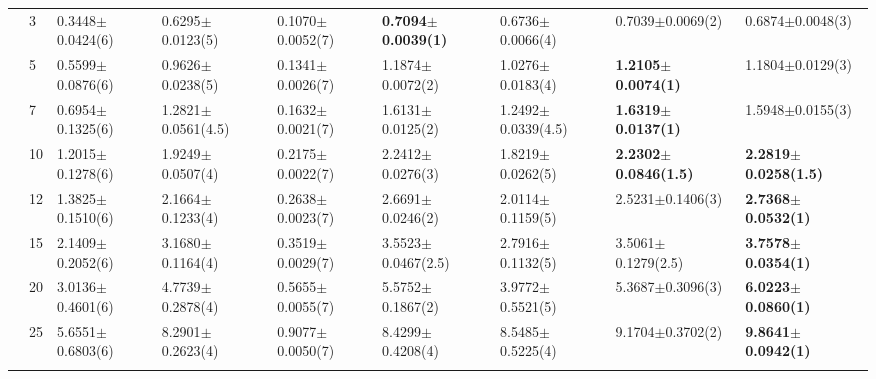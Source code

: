\begin{table*}[]
\begin{adjustbox}{width=1.0\textwidth,center}
\begin{tabular}{lllllllll}
      & 3                              & 0.3448$\pm$0.0424(6)         & 0.6295$\pm$0.0123(5)          & 0.1070$\pm$0.0052(7)              & \textbf{0.7094$\pm$0.0039(1)}                     & 0.6736$\pm$0.0066(4)                     & 0.7039$\pm$0.0069(2)                       & 0.6874$\pm$0.0048(3)            \\
      & 5                              & 0.5599$\pm$0.0876(6)         & 0.9626$\pm$0.0238(5)          & 0.1341$\pm$0.0026(7)              & 1.1874$\pm$0.0072(2)                              & 1.0276$\pm$0.0183(4)                     & \textbf{1.2105$\pm$0.0074(1)}              & 1.1804$\pm$0.0129(3)            \\
      & 7                              & 0.6954$\pm$0.1325(6)         & 1.2821$\pm$0.0561(4.5)        & 0.1632$\pm$0.0021(7)              & 1.6131$\pm$0.0125(2)                              & 1.2492$\pm$0.0339(4.5)                   & \textbf{1.6319$\pm$0.0137(1)}              & 1.5948$\pm$0.0155(3)            \\
      & 10                             & 1.2015$\pm$0.1278(6)         & 1.9249$\pm$0.0507(4)          & 0.2175$\pm$0.0022(7)              & 2.2412$\pm$0.0276(3)                              & 1.8219$\pm$0.0262(5)                     & \textbf{2.2302$\pm$0.0846(1.5)}            & \textbf{2.2819$\pm$0.0258(1.5)} \\
      & 12                             & 1.3825$\pm$0.1510(6)         & 2.1664$\pm$0.1233(4)          & 0.2638$\pm$0.0023(7)              & 2.6691$\pm$0.0246(2)                              & 2.0114$\pm$0.1159(5)                     & 2.5231$\pm$0.1406(3)                       & \textbf{2.7368$\pm$0.0532(1)}   \\
      & 15                             & 2.1409$\pm$0.2052(6)         & 3.1680$\pm$0.1164(4)          & 0.3519$\pm$0.0029(7)              & 3.5523$\pm$0.0467(2.5)                            & 2.7916$\pm$0.1132(5)                     & 3.5061$\pm$0.1279(2.5)                     & \textbf{3.7578$\pm$0.0354(1)}   \\
      & 20                             & 3.0136$\pm$0.4601(6)         & 4.7739$\pm$0.2878(4)          & 0.5655$\pm$0.0055(7)              & 5.5752$\pm$0.1867(2)                              & 3.9772$\pm$0.5521(5)                     & 5.3687$\pm$0.3096(3)                       & \textbf{6.0223$\pm$0.0860(1)}   \\
      & 25                             & 5.6551$\pm$0.6803(6)         & 8.2901$\pm$0.2623(4)          & 0.9077$\pm$0.0050(7)              & 8.4299$\pm$0.4208(4)                              & 8.5485$\pm$0.5225(4)                     & 9.1704$\pm$0.3702(2)                       & \textbf{9.8641$\pm$0.0942(1)}   \\\thickhline

\end{tabular}
\end{adjustbox}
\end{table*}
